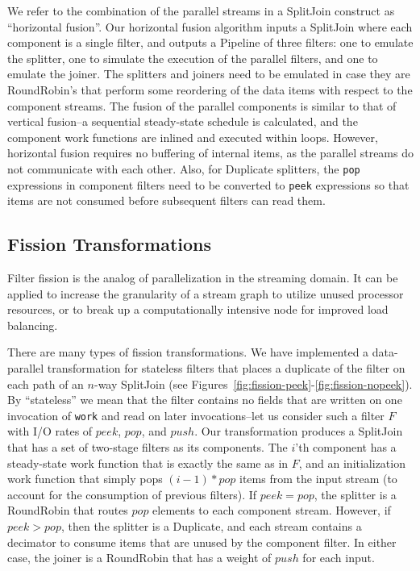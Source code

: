 We refer to the combination of the parallel streams in a SplitJoin
construct as ``horizontal fusion''.  Our horizontal fusion algorithm
inputs a SplitJoin where each component is a single filter, and
outputs a Pipeline of three filters: one to emulate the splitter, one
to simulate the execution of the parallel filters, and one to emulate
the joiner.  The splitters and joiners need to be emulated in case
they are RoundRobin's that perform some reordering of the data items
with respect to the component streams.  The fusion of the parallel
components is similar to that of vertical fusion--a sequential
steady-state schedule is calculated, and the component work functions
are inlined and executed within loops.  However, horizontal fusion
requires no buffering of internal items, as the parallel streams do
not communicate with each other.  Also, for Duplicate splitters, the
{\tt pop} expressions in component filters need to be converted to
{\tt peek} expressions so that items are not consumed before
subsequent filters can read them.

\subsection{Fission Transformations}

Filter fission is the analog of parallelization in the streaming
domain.  It can be applied to increase the granularity of a stream
graph to utilize unused processor resources, or to break up a
computationally intensive node for improved load balancing.  

There are many types of fission transformations.  We have implemented
a data-parallel transformation for stateless filters that places a
duplicate of the filter on each path of an $n$-way SplitJoin (see
Figures~\ref{fig:fission-peek}-\ref{fig:fission-nopeek}).  By
``stateless'' we mean that the filter contains no fields that are
written on one invocation of {\tt work} and read on later
invocations--let us consider such a filter $F$ with I/O rates of
$peek$, $pop$, and $push$.  Our transformation produces a SplitJoin
that has a set of two-stage filters as its components.  The $i$'th
component has a steady-state work function that is exactly the same as
in $F$, and an initialization work function that simply pops
$(i-1)*pop$ items from the input stream (to account for the
consumption of previous filters).  If $peek=pop$, the splitter is a
RoundRobin that routes $pop$ elements to each component stream.
However, if $peek>pop$, then the splitter is a Duplicate, and each
stream contains a decimator to consume items that are unused by the
component filter.  In either case, the joiner is a RoundRobin that has
a weight of $push$ for each input.

